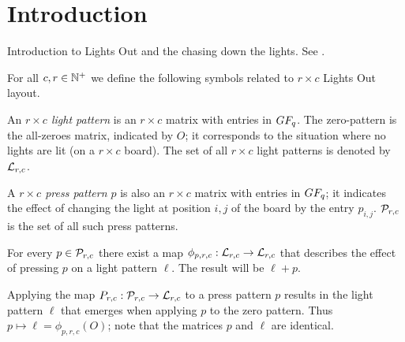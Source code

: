\section{Introduction}

Introduction to Lights Out and the chasing down the lights. See \cite{martin01}.

\begin{definition}
  For all $c,r\in\mathbb{N}^{+}$ we define the following symbols related to
  $r \times c$ Lights Out layout.

  An {\it $r\times c$ light pattern} is an $r\times c$ matrix
  with entries in $GF_q$. The zero-pattern is the all-zeroes
  matrix, indicated by $O$; it corresponds to the situation
  where no lights are lit (on a $r\times c$ board).
  The set of all $r\times c$ light patterns is denoted by $\mathcal{L}_{r,c}$.

  A {\it $r\times c$ press pattern $p$} is also an $r\times c$ matrix
  with entries in $GF_q$; it indicates the effect of changing
  the light at position $i, j$ of the board by the entry $p_{i,j}$.
  $\mathcal{P}_{r,c}$ is the set of all such press patterns.

  For every $p\in\mathcal{P}_{r,c}$ there exist a map $\phi_{p,r,c} : \mathcal{L}_{r,c}
  \rightarrow \mathcal{L}_{r,c}$ that describes the effect of pressing $p$ on
  a light pattern $\ell$.  The result will be $\ell + p$.

  Applying the map
  $P_{r,c} : \mathcal{P}_{r,c} \rightarrow \mathcal{L}_{r,c}$
  to a press pattern $p$ results in the light pattern $\ell$ that
  emerges when applying $p$ to the zero pattern. Thus
  $p \mapsto \ell=\phi_{p,r,c}(O)$; note that the
  matrices $p$ and $\ell$ are identical.
\end{definition}
